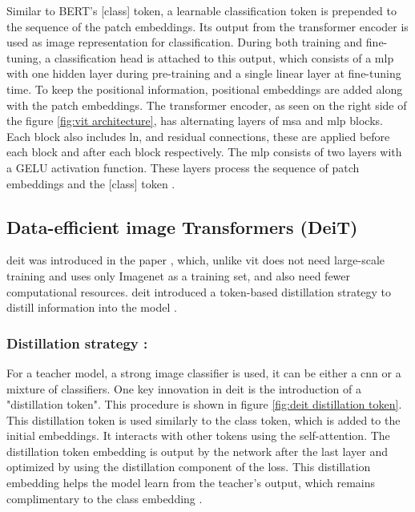 Similar to BERT's [class] token, a learnable classification token is prepended to the sequence of the patch embeddings. Its output from the transformer encoder is used as image representation for classification. During both training and fine-tuning, a classification head is attached to this output, which consists of a \gls{mlp} with one hidden layer during pre-training and a single linear layer at fine-tuning time. To keep the positional information, positional embeddings are added along with the patch embeddings. The transformer encoder, as seen on the right side of the figure \ref{fig:vit architecture}, has alternating layers of \gls{msa} and \gls{mlp} blocks. Each block also includes \gls{ln}, and residual connections, these are applied before each block and after each block respectively. The \gls{mlp} consists of two layers with a GELU activation function. These layers process the sequence of patch embeddings and the [class] token \cite{dosovitskiy2020image}.

\subsection{Data-efficient image Transformers (DeiT)}

\gls{deit} was introduced in the paper \cite{pmlr-v139-touvron21a}, which, unlike \gls{vit}\cite{dosovitskiy2020image} does not need large-scale training and uses only Imagenet as a training set, and also need fewer computational resources. \gls{deit} introduced a token-based distillation strategy to distill information into the model \cite{pmlr-v139-touvron21a}.

\subsubsection*{Distillation strategy :}

For a teacher model, a strong image classifier is used, it can be either a \gls{cnn} or a mixture of classifiers. One key innovation in \gls{deit} is the introduction of a "distillation token". This procedure is shown in figure \ref{fig:deit distillation token}. This distillation token is used similarly to the class token, which is added to the initial embeddings. It interacts with other tokens using the self-attention. The distillation token embedding is output by the network after the last layer and optimized by using the distillation component of the loss. This distillation embedding helps the model learn from the teacher's output, which remains complimentary to the class embedding \cite{pmlr-v139-touvron21a}.


